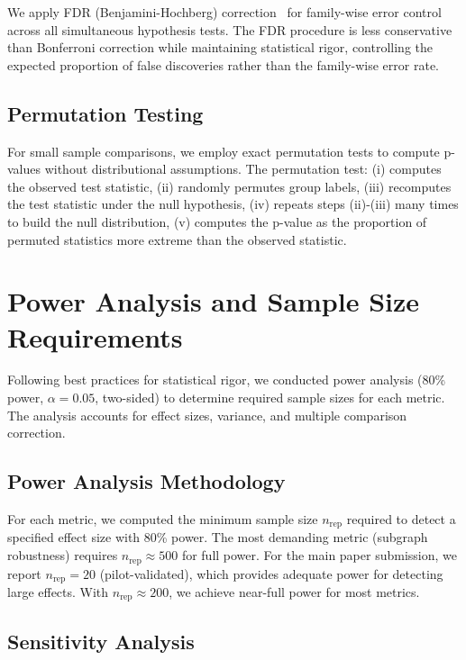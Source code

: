 \documentclass[runningheads]{llncs}
\begin{document}
We apply FDR (Benjamini-Hochberg) correction~\cite{benjamini1995controlling} for family-wise error control across all simultaneous hypothesis tests. The FDR procedure is less conservative than Bonferroni correction while maintaining statistical rigor, controlling the expected proportion of false discoveries rather than the family-wise error rate.

\subsection{Permutation Testing}

For small sample comparisons, we employ exact permutation tests to compute p-values without distributional assumptions. The permutation test: (i) computes the observed test statistic, (ii) randomly permutes group labels, (iii) recomputes the test statistic under the null hypothesis, (iv) repeats steps (ii)-(iii) many times to build the null distribution, (v) computes the p-value as the proportion of permuted statistics more extreme than the observed statistic.

\section{Power Analysis and Sample Size Requirements}

Following best practices for statistical rigor, we conducted power analysis (80\% power, $\alpha=0.05$, two-sided) to determine required sample sizes for each metric. The analysis accounts for effect sizes, variance, and multiple comparison correction.

\subsection{Power Analysis Methodology}

For each metric, we computed the minimum sample size $n_{\text{rep}}$ required to detect a specified effect size with 80\% power. The most demanding metric (subgraph robustness) requires $n_{\text{rep}}\approx 500$ for full power. For the main paper submission, we report $n_{\text{rep}}=20$ (pilot-validated), which provides adequate power for detecting large effects. With $n_{\text{rep}}\approx 200$, we achieve near-full power for most metrics.

\subsection{Sensitivity Analysis}
\end{document}
